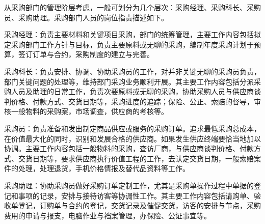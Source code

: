     从采购部门的管理阶层考虑，一般可划分为几个层次：采购经理、采购科长、采购员、采购助理。采购部门人员的岗位指责描述如下。

    \begin{enumerate.zh}
        \item 采购经理：负责主要材料和关键项目采购，部门的统筹管理，主要工作内容包括拟定采购部门工作方针与目标，负责主要原料或无聊的采购，编制年度采购计划于预算，签订订单与合约，采购制度的建立与完善。

        \item 采购科长：负责安排、协调、协助采购员的工作，对并非关键无聊的采购员负责，部门关键问题的处理等，维持部门采购业务顺利开展。其主要工作内容包括分派采购人员及助理的日常工作，负责次要原料或无聊的采购，协助采购人员与供应商谈判价格、付款方式、交货日期等，采购进度的追踪；保险、公正、索赔的督导，审核一般物料的采购案，市场调查，供应商的考核等。

        \item 采购员：负责准备和发出制定商品供应或服务的采购订单。追求最低采购总成本，在价值最大化的同时，识别和发展合格的供应商。如果发生供应终端要恰当地加以协调。主要工作内容包括一般物料的采购，查访厂商，与供应商谈判价格、付款方式、交货日期等，要求供应商执行价值工程的工作，去认定交货日期，一般索赔案件的处理，处理退货，手机价格情报及替代品资料等工作。

        \item 采购助理：协助采购员做好采购订单定制工作，尤其是采购单操作过程中单据的登记和事项的记录，安排与接待访客等协调性工作。其主要工作内容包括请购单、验收单登记，订购单与合约的登记，交货记录及催促交货，访客的安排与节点，采购费用的申请与报支，电脑作业与裆案管理，办保险、公证事宜等。
    \end{enumerate.zh}
